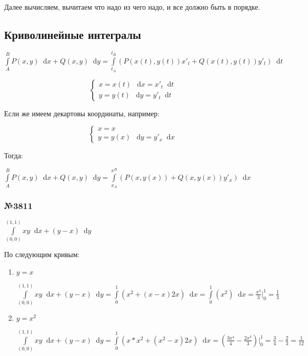 \documentclass{article}
\newcommand*\diff{\mathop{}\!\mathrm{d}}
\begin{document}
Далее вычисляем, вычитаем что надо из чего надо, и все должно быть в порядке.

\subsection{Криволинейные интегралы}

$\int\limits_{A}^{B} P(x, y) \diff x + Q(x, y) \diff y = \int\limits_{t_{A}}^{t_{B}} (P(x(t), y(t)) x'_t + Q(x(t), y(t)) y'_t) \diff t$

\begin{equation}
    \begin{cases}
        x = x(t) \ \diff x = x'_t \diff t \\
        y = y(t) \ \diff y = y'_t \diff t
    \end{cases}
\end{equation}

Если же имеем декартовы координаты, например:

\begin{equation}
    \begin{cases}
        x = x \\
        y = y(x) \ \diff y = y'_x \diff x
    \end{cases}
\end{equation}

Тогда:

$\int\limits_{A}^{B} P(x, y) \diff x + Q(x, y) \diff y = \int\limits_{x_{A}}^{x^{B}} (P(x, y(x)) + Q(x, y(x)) y'_x) \diff x$

\subsubsection{№3811}

$\int\limits_{(0, 0)}^{(1, 1)} x y \diff x + (y - x) \diff y$

По следующим кривым:

\begin{enumerate}
    \item $y = x$
    
    $\int\limits_{(0, 0)}^{(1, 1)} xy \diff x + (y - x) \diff y = \int\limits_{0}^{1} (x^2 + (x - x) 2x) \diff x = \int\limits_{0}^{1} (x^2) \diff x = \frac{x^3}{3} \bigg|_{0}^{1} = \frac{1}{3}$
    \item $y = x^2$
    
    $\int\limits_{(0, 0)}^{(1, 1)} x y \diff x + (y - x) \diff y = \int\limits_{0}^{1} (x * x^2 + (x^2 - x) 2x) \diff x = (\frac{3x^4}{4} - \frac{2x^3}{3}) \bigg|_{0}^{1} = \frac{3}{4} - \frac{2}{3} = \frac{1}{12}$
\end{enumerate}
\end{document}
